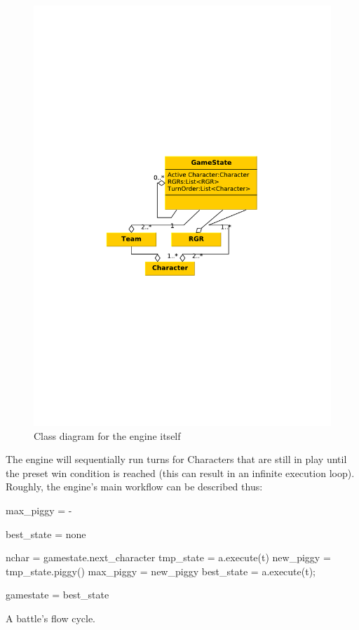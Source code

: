 \begin{figure}[!h]
\centering
\includegraphics[scale=.5, clip=true, trim=0cm 8cm 1cm 8cm]{img/engine_class_diagram}
\caption{\label{figure:design:engine:engine}Class diagram for the engine itself}
\end{figure}

The engine will sequentially run turns for Characters that are still in play until the preset win condition is reached (this can result in an infinite execution loop). Roughly, the engine's main workflow can be described thus:

\begin{algorithm}
	\SetAlgoLined	
	
	{
		max\_piggy = -\infty \;	
		
		best\_state = none\;
	
		nchar = gamestate.next\_character\;
		{
			{
				tmp\_state = a.execute(t)\;
				new\_piggy = tmp\_state.piggy()\;
				{
					max\_piggy = new\_piggy\;
					best\_state = a.execute(t);
				}
			}
		}
		
		gamestate = best\_state\;
	}
	\caption{\label{figure:engindesign:engine:algorithm}A battle's flow cycle.}
\end{algorithm}

